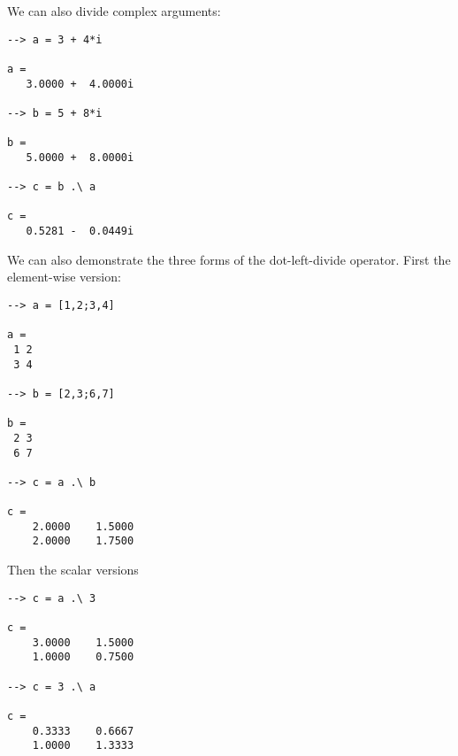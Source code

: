 We can also divide complex arguments:
\begin{verbatim}
--> a = 3 + 4*i

a = 
   3.0000 +  4.0000i 

--> b = 5 + 8*i

b = 
   5.0000 +  8.0000i 

--> c = b .\ a

c = 
   0.5281 -  0.0449i 
\end{verbatim}
We can also demonstrate the three forms of the dot-left-divide operator.  First
the element-wise version:
\begin{verbatim}
--> a = [1,2;3,4]

a = 
 1 2 
 3 4 

--> b = [2,3;6,7]

b = 
 2 3 
 6 7 

--> c = a .\ b

c = 
    2.0000    1.5000 
    2.0000    1.7500 
\end{verbatim}
Then the scalar versions
\begin{verbatim}
--> c = a .\ 3

c = 
    3.0000    1.5000 
    1.0000    0.7500 

--> c = 3 .\ a

c = 
    0.3333    0.6667 
    1.0000    1.3333 
\end{verbatim}
